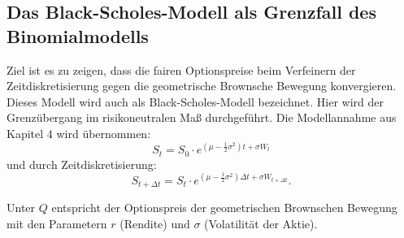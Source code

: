 \subsection{Das Black-Scholes-Modell als Grenzfall des Binomialmodells}
Ziel ist es zu zeigen, dass die fairen Optionspreise
beim Verfeinern der Zeitdiskretisierung gegen die geometrische Brownsche Bewegung konvergieren.
Dieses Modell wird auch als Black-Scholes-Modell bezeichnet. Hier wird der Grenzübergang im risikoneutralen Maß durchgeführt.
Die Modellannahme aus Kapitel 4 wird übernommen:
$$
S_t = S_0 \cdot e^{(\mu - \frac{1}{2}\sigma^2)t + \sigma W_t}
$$
und durch Zeitdiskretisierung:
$$
S_{t+\Delta t} = S_t \cdot e^{(\mu - \frac{1}{2}\sigma^2)\Delta t + \sigma W_{t+\Delta t}}.
$$

\begin{satz}
Unter $Q$ entspricht der Optionspreis der geometrischen Brownschen Bewegung mit den Parametern $r$ (Rendite)
und $\sigma$ (Volatilität der Aktie).



\end{satz}
